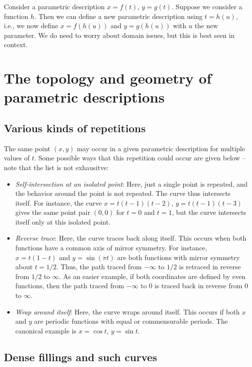 \documentclass[10pt]{amsart}
\begin{document}
Consider a parametric description $x = f(t)$, $y = g(t)$. Suppose we
consider a function $h$. Then we can define a new parametric
description using $t = h(u)$, i.e., we now define $x = f(h(u))$ and $y
= g(h(u))$ with $u$ the new parameter. We do need to worry about
domain issues, but this is best seen in context.

\section{The topology and geometry of parametric descriptions}

\subsection{Various kinds of repetitions}

The same point $(x,y)$ may occur in a given parametric description for
multiple values of $t$. Some possible ways that this repetition could
occur are given below -- note that the list is not exhausitve:

\begin{itemize}
\item {\em Self-intersection at an isolated point}: Here, just a single
  point is repeated, and the behavior around the point is not
  repeated. The curve thus intersects itself. For instance, the curve
  $x = t(t-1)(t-2)$, $y = t(t-1)(t-3)$ gives the same point pair
  $(0,0)$ for $t = 0$ and $t = 1$, but the curve intersects itself
  only at this isolated point.
\item {\em Reverse trace}: Here, the curve traces back along
  itself. This occurs when both functions have a common axis of mirror
  symmetry. For instance, $x = t(1 - t)$ and $y = \sin(\pi t)$ are
  both functions with mirror symmetry about $t = 1/2$. Thus, the path
  traced from $-\infty$ to $1/2$ is retraced in reverse from $1/2$ to
  $\infty$. As an easier example, if both coordinates are defined by
  even functions, then the path traced from $-\infty$ to $0$ is traced
  back in reverse from $0$ to $\infty$.
\item {\em Wrap around itself}: Here, the curve wraps around
  itself. This occurs if both $x$ and $y$ are periodic functions with
  equal or commensurable periods. The canonical example is $x = \cos
  t$, $y = \sin t$.
\end{itemize}

\subsection{Dense fillings and such curves}
\end{document}
